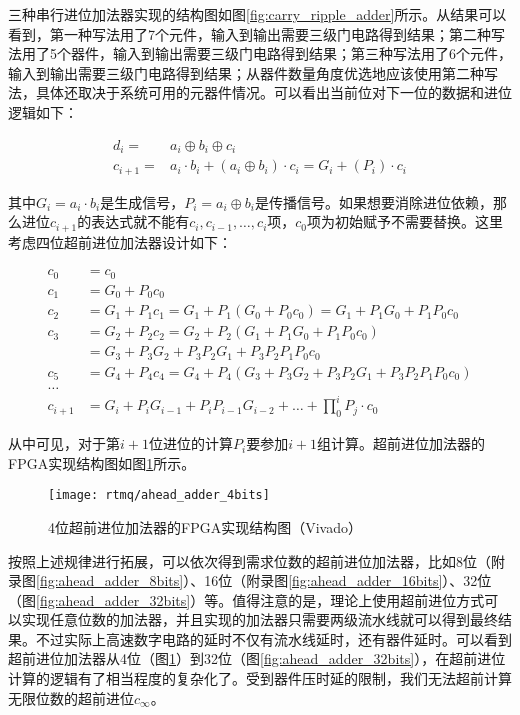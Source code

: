 三种串行进位加法器实现的结构图如图\ref{fig:carry_ripple_adder}所示。从结果可以看到，第一种写法用了7个元件，输入到输出需要三级门电路得到结果；第二种写法用了5个器件，输入到输出需要三级门电路得到结果；第三种写法用了6个元件，输入到输出需要三级门电路得到结果；从器件数量角度优选地应该使用第二种写法，具体还取决于系统可用的元器件情况。可以看出当前位对下一位的数据和进位逻辑如下：

\begin{align}
    d_i =& a_i\oplus b_i \oplus c_i\\
    c_{i+1}=& a_i \cdot b_i +(a_i \oplus b_i)\cdot c_i = G_i + (P_i)\cdot c_i
\end{align}

其中$G_i=a_i \cdot b_i$是生成信号，$P_i=a_i \oplus b_i$是传播信号。如果想要消除进位依赖，那么进位$c_{i+1}$的表达式就不能有$c_i, c_{i-1}, \dots, c_i$项，$c_0$项为初始赋予不需要替换。这里考虑四位超前进位加法器设计如下：

\begin{align}
    c_0 &= c_0\\
    c_1 &= G_0 + P_0 c_0\\
    c_2 &= G_1 + P_1 c_1 = G_1+P_1 (G_0+P_0 c_0 )=G_1+P_1 G_0+P_1 P_0 c_0\\
    c_3 &=G_2+P_2 c_2=G_2+P_2 (G_1+P_1 G_0+P_1 P_0 c_0 )\\
    &=G_3+P_3 G_2+P_3 P_2 G_1+P_3 P_2 P_1 P_0 c_0\\
    c_5 &=G_4+P_4 c_4=G_4+P_4 (G_3+P_3 G_2+P_3 P_2 G_1+P_3 P_2 P_1 P_0 c_0 )\\
    \dots\\
    c_{i+1} &=G_i+P_i G_{i-1}+P_i P_{i-1} G_{i-2}+ \dots +\prod_0^i P_j \cdot c_0
\end{align}

从中可见，对于第$i+1$位进位的计算$P_i$要参加$i+1$组计算。超前进位加法器的FPGA实现结构图如图\ref{fig:ahead_adder_4bits}所示。

\begin{figure}
    \centering
    \caption[4位超前进位加法器的FPGA实现结构图]{4位超前进位加法器的FPGA实现结构图（Vivado）\label{fig:ahead_adder_4bits}}
    \texttt{[image: rtmq/ahead\_adder\_4bits]}
\end{figure}

按照上述规律进行拓展，可以依次得到需求位数的超前进位加法器，比如8位（附录图\ref{fig:ahead_adder_8bits}）、16位（附录图\ref{fig:ahead_adder_16bits}）、32位（图\ref{fig:ahead_adder_32bits}）等。值得注意的是，理论上使用超前进位方式可以实现任意位数的加法器，并且实现的加法器只需要两级流水线就可以得到最终结果。不过实际上高速数字电路的延时不仅有流水线延时，还有器件延时。可以看到超前进位加法器从4位（图\ref{fig:ahead_adder_4bits}）到32位（图\ref{fig:ahead_adder_32bits}），在超前进位计算的逻辑有了相当程度的复杂化了。受到器件压时延的限制，我们无法超前计算无限位数的超前进位$c_{\infty}$。

